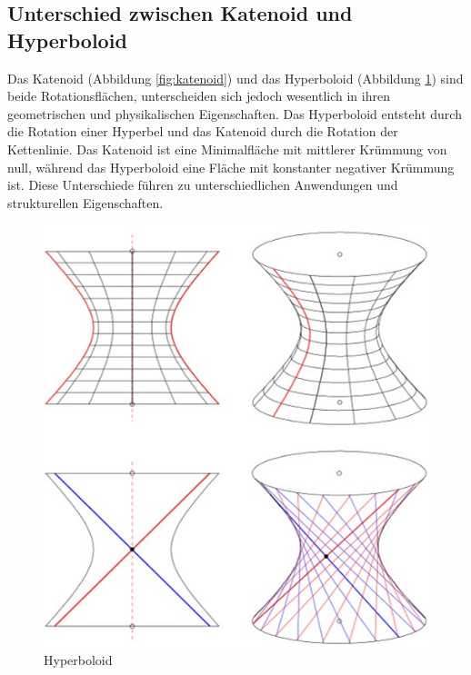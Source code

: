 \subsection{Unterschied zwischen Katenoid und Hyperboloid
	\label{Das Katenoid:subsection:Unterschied zwischen Katenoid und Hyperboloid}}
Das Katenoid (Abbildung \ref{fig:katenoid}) und das Hyperboloid (Abbildung \ref{fig:bild1}) sind beide Rotationsflächen, unterscheiden sich jedoch wesentlich in ihren geometrischen und physikalischen Eigenschaften.
Das Hyperboloid entsteht durch die Rotation einer Hyperbel und das Katenoid durch die Rotation der Kettenlinie. 
Das Katenoid ist eine Minimalfläche mit mittlerer Krümmung von null, während das Hyperboloid eine Fläche mit konstanter negativer Krümmung ist.
Diese Unterschiede führen zu unterschiedlichen Anwendungen und strukturellen Eigenschaften.
\begin{figure}
	\centering
	\includegraphics[width=0.7\linewidth]{papers/minimalflaechen/Bild1}
	\caption{Hyperboloid \cite{minimalflaechen:Hyperboloid}}
	\label{fig:bild1}
\end{figure}

